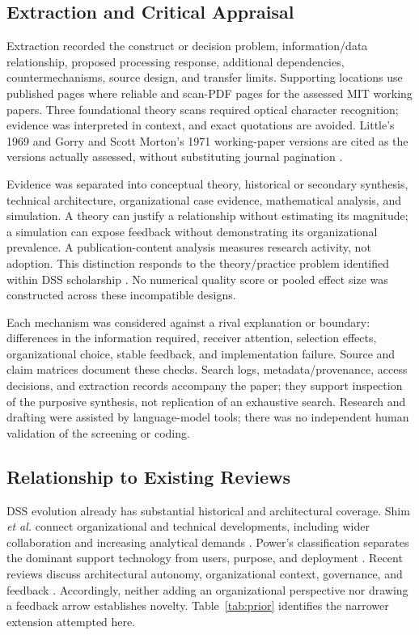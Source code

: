 \documentclass[journal]{IEEEtran}
\begin{document}
\subsection{Extraction and Critical Appraisal}
Extraction recorded the construct or decision problem, information/data relationship, proposed processing response, additional dependencies, countermechanisms, source design, and transfer limits. Supporting locations use published pages where reliable and scan-PDF pages for the assessed MIT working papers. Three foundational theory scans required optical character recognition; evidence was interpreted in context, and exact quotations are avoided. Little's 1969 and Gorry and Scott Morton's 1971 working-paper versions are cited as the versions actually assessed, without substituting journal pagination \cite{little1969,gorry1971}.

Evidence was separated into conceptual theory, historical or secondary synthesis, technical architecture, organizational case evidence, mathematical analysis, and simulation. A theory can justify a relationship without estimating its magnitude; a simulation can expose feedback without demonstrating its organizational prevalence. A publication-content analysis measures research activity, not adoption. This distinction responds to the theory/practice problem identified within DSS scholarship \cite{arnott2008}. No numerical quality score or pooled effect size was constructed across these incompatible designs.

Each mechanism was considered against a rival explanation or boundary: differences in the information required, receiver attention, selection effects, organizational choice, stable feedback, and implementation failure. Source and claim matrices document these checks. Search logs, metadata/provenance, access decisions, and extraction records accompany the paper; they support inspection of the purposive synthesis, not replication of an exhaustive search. Research and drafting were assisted by language-model tools; there was no independent human validation of the screening or coding.

\subsection{Relationship to Existing Reviews}
DSS evolution already has substantial historical and architectural coverage. Shim \emph{et al.} connect organizational and technical developments, including wider collaboration and increasing analytical demands \cite{shim2002}. Power's classification separates the dominant support technology from users, purpose, and deployment \cite{power2004}. Recent reviews discuss architectural autonomy, organizational context, governance, and feedback \cite{Budianto2026,Eze2026}. Accordingly, neither adding an organizational perspective nor drawing a feedback arrow establishes novelty. Table~\ref{tab:prior} identifies the narrower extension attempted here.
\end{document}
